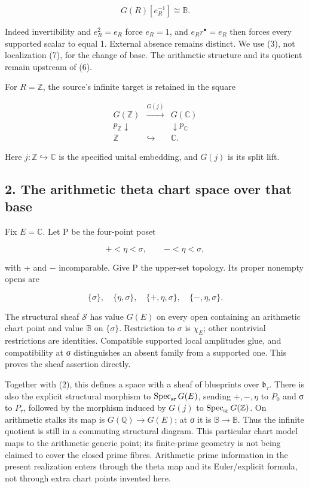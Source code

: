 \documentclass[
]{article}
\begin{document}
\[
G(R)[e_R^{-1}]\cong\mathbb B.
\tag{7}
\]

Indeed invertibility and \(e_R^2=e_R\) force \(e_R=1\), and
\(e_Rr^\bullet=e_R\) then forces every supported scalar to equal 1.
External absence remains distinct. We use (3), not localization (7), for
the change of base. The arithmetic structure and its quotient remain
upstream of (6).

For \(R=\mathbb Z\), the source's infinite target is retained in the
square

\[
\begin{array}{ccc}
G(\mathbb Z)&\xrightarrow{G(j)}&G(\mathbb C)\\
p_{\mathbb Z}\downarrow&&\downarrow p_{\mathbb C}\\
\mathbb Z&\hookrightarrow&\mathbb C.
\end{array}
\tag{8}
\]

Here \(j:\mathbb Z\hookrightarrow\mathbb C\) is the specified unital
embedding, and \(G(j)\) is its split lift.

\subsection{2. The arithmetic theta chart space over that
base}\label{the-arithmetic-theta-chart-space-over-that-base}

Fix \(E=\mathbb C\). Let P be the four-point poset

\[
+<\eta<\sigma,\qquad -<\eta<\sigma,
\tag{9}
\]

with + and − incomparable. Give P the upper-set topology. Its proper
nonempty opens are

\[
\{\sigma\},\quad\{\eta,\sigma\},\quad
\{+,\eta,\sigma\},\quad\{-,\eta,\sigma\}.
\]

The structural sheaf \(\mathcal S\) has value \(G(E)\) on every open
containing an arithmetic chart point and value \(\mathbb B\) on
\(\{\sigma\}\). Restriction to \(\sigma\) is \(\chi_E\); other
nontrivial restrictions are identities. Compatible supported local
amplitudes glue, and compatibility at σ distinguishes an absent family
from a supported one. This proves the sheaf assertion directly.

Together with (2), this defines a space with a sheaf of blueprints over
\(\mathfrak b_\tau\). There is also the explicit structural morphism to
\(\operatorname{Spec}_{\rm sr}G(E)\), sending \(+, -,\eta\) to \(P_0\)
and σ to \(P_\tau\), followed by the morphism induced by \(G(j)\) to
\(\operatorname{Spec}_{\rm sr}G(\mathbb Z)\). On arithmetic stalks its
map is \(G(\mathbb Q)\to G(E)\); at σ it is \(\mathbb B\to\mathbb B\).
Thus the infinite quotient is still in a commuting structural diagram.
This particular chart model maps to the arithmetic generic point; its
finite-prime geometry is not being claimed to cover the closed prime
fibres. Arithmetic prime information in the present realization enters
through the theta map and its Euler/explicit formula, not through extra
chart points invented here.
\end{document}
